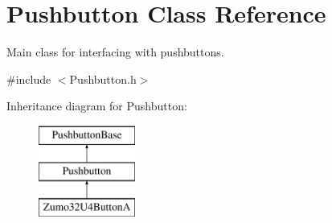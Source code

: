 \hypertarget{class_pushbutton}{}\section{Pushbutton Class Reference}
\label{class_pushbutton}


Main class for interfacing with pushbuttons.  




{\ttfamily \#include $<$Pushbutton.\+h$>$}

Inheritance diagram for Pushbutton\+:\begin{figure}[H]
\begin{center}
\leavevmode
\includegraphics[height=3.000000cm]{class_pushbutton}
\end{center}
\end{figure}
